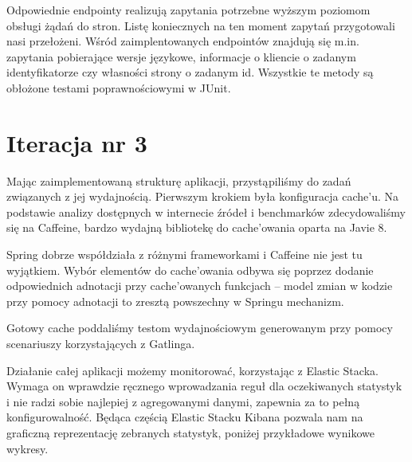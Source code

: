 \documentclass[licencjacka]{pracamgr}
\begin{document}
\vspace{1mm}

Odpowiednie endpointy realizują zapytania potrzebne wyższym poziomom obsługi żądań do stron. Listę koniecznych na ten moment zapytań przygotowali nasi przełożeni. Wśród zaimplentowanych endpointów znajdują się m.in. zapytania pobierające wersje językowe, informacje o kliencie o zadanym identyfikatorze czy własności strony o zadanym id. Wszystkie te metody są obłożone testami poprawnościowymi w JUnit.

\section{Iteracja nr 3}

Mając zaimplementowaną strukturę aplikacji, przystąpiliśmy do zadań związanych z jej wydajnością. Pierwszym krokiem była konfiguracja cache’u. Na podstawie analizy dostępnych w internecie źródeł i benchmarków zdecydowaliśmy się na Caffeine, bardzo wydajną bibliotekę do cache’owania oparta na Javie 8.

\vspace{1mm}

Spring dobrze współdziała z różnymi frameworkami i Caffeine nie jest tu wyjątkiem. Wybór elementów do cache’owania odbywa się poprzez dodanie odpowiednich adnotacji przy cache’owanych funkcjach – model zmian w kodzie przy pomocy adnotacji to zresztą powszechny w Springu mechanizm.

\vspace{1mm}

Gotowy cache poddaliśmy testom wydajnościowym generowanym przy pomocy scenariuszy korzystających z Gatlinga.

\vspace{1mm}

Działanie całej aplikacji możemy monitorować, korzystając z Elastic Stacka. Wymaga on wprawdzie ręcznego wprowadzania reguł dla oczekiwanych statystyk i nie radzi sobie najlepiej z agregowanymi danymi, zapewnia za to pełną konfigurowalność. Będąca częścią Elastic Stacku Kibana pozwala nam na graficzną reprezentację zebranych statystyk, poniżej przykładowe wynikowe wykresy.
\end{document}
